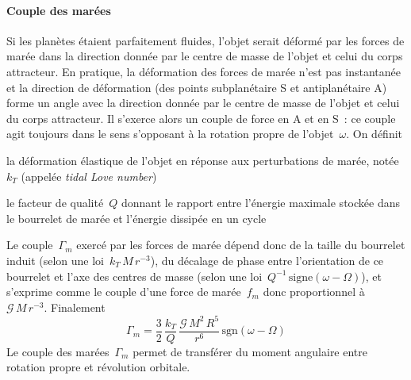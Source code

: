 


\sk
\paragraph{Couple des marées} Si les planètes étaient parfaitement fluides, l'objet serait déformé par les forces de marée dans la direction donnée par le centre de masse de l'objet et celui du corps attracteur. En pratique, la déformation des forces de marée n'est pas instantanée et la direction de déformation (des points subplanétaire S et antiplanétaire A) forme un angle avec la direction donnée par le centre de masse de l'objet et celui du corps attracteur. Il s'exerce alors un couple de force en A et en S~: ce couple agit toujours dans le sens s'opposant à la rotation propre de l'objet~$\omega$. On définit 
\begin{citemize}
\item la déformation élastique de l'objet en réponse aux perturbations de marée, notée $k_T$ (appelée \emph{tidal Love number})
\item le facteur de qualité~$Q$ donnant le rapport entre l'énergie maximale stockée dans le bourrelet de marée et l'énergie dissipée en un cycle 
\end{citemize}
\noindent Le couple~$\Gamma_m$ exercé par les forces de marée dépend donc de la taille du bourrelet induit (selon une loi~$k_T \, M \, r^{-3}$), du décalage de phase entre l'orientation de ce bourrelet et l'axe des centres de masse (selon une loi~$Q^{-1}\,\textrm{signe}(\omega-\Omega)$), et s'exprime comme le couple d'une force de marée~$f_m$ donc proportionnel à~$\mathcal{G}\,M\,r^{-3}$. Finalement
\[ \Gamma_m = \frac{3}{2} \, \frac{k_T}{Q} \, \frac{\mathcal{G}\,M^2\,R^5}{r^6} \, \textrm{sgn}(\omega-\Omega) \]
\noindent Le couple des marées~$\Gamma_m$ permet de transférer du moment angulaire entre rotation propre et révolution orbitale.


\sk
